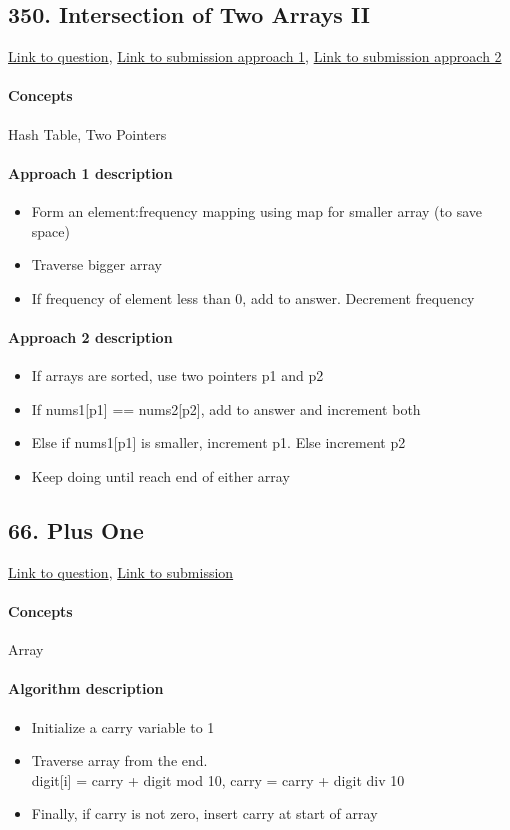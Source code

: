 \documentclass[11pt]{book}
\begin{document}
\subsection{350. Intersection of Two Arrays II}
\href{https://leetcode.com/problems/intersection-of-two-arrays-ii/}{Link to question},
\href{https://leetcode.com/submissions/detail/333119654/}{Link to submission approach 1},
\href{https://leetcode.com/submissions/detail/333123474/}{Link to submission approach 2}
\paragraph{Concepts}
Hash Table, Two Pointers
\paragraph{Approach 1 description}
\begin{itemize}
    \item Form an element:frequency mapping using map for smaller array (to save space)
    \item Traverse bigger array
    \item If frequency of element less than 0, add to answer. Decrement frequency
\end{itemize}
\paragraph{Approach 2 description}
\begin{itemize}
    \item If arrays are sorted, use two pointers p1 and p2
    \item If nums1[p1] == nums2[p2], add to answer and increment both
    \item Else if nums1[p1] is smaller, increment p1. Else increment p2
    \item Keep doing until reach end of either array
\end{itemize}

\subsection{66. Plus One}
\href{https://leetcode.com/problems/plus-one/}{Link to question},
\href{https://leetcode.com/submissions/detail/333134799/}{Link to submission}
\paragraph{Concepts}
Array
\paragraph{Algorithm description}
\begin{itemize}
    \item Initialize a carry variable to 1
    \item Traverse array from the end. \\ digit[i] = carry + digit mod 10, carry = carry + digit div 10
    \item Finally, if carry is not zero, insert carry at start of array
\end{itemize}
\end{document}
